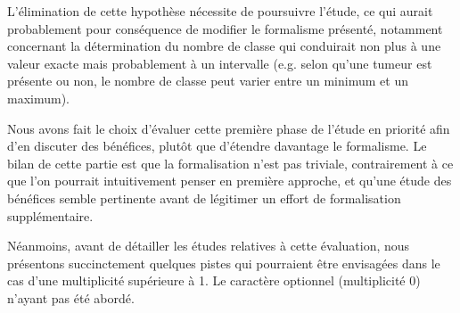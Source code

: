 	L'élimination de cette hypothèse nécessite de poursuivre l'étude, ce qui aurait probablement pour conséquence de modifier le formalisme présenté, notamment concernant la détermination du nombre de classe qui conduirait non plus à une valeur exacte mais probablement à un intervalle (e.g. selon qu'une tumeur est présente ou non, le nombre de classe peut varier entre un minimum et un maximum).
	
	Nous avons fait le choix d'évaluer cette première phase de l'étude en priorité afin d'en discuter des bénéfices, plutôt que d'étendre davantage le formalisme. Le bilan de cette partie est que la formalisation n'est pas triviale, contrairement à ce que l'on pourrait intuitivement penser en première approche, et qu'une étude des bénéfices semble pertinente avant de légitimer un effort de formalisation supplémentaire.

	Néanmoins, avant de détailler les études relatives à cette évaluation, nous présentons succinctement quelques pistes qui pourraient être envisagées dans le cas d'une multiplicité supérieure à 1. Le caractère optionnel (multiplicité 0) n'ayant pas été abordé.
	




